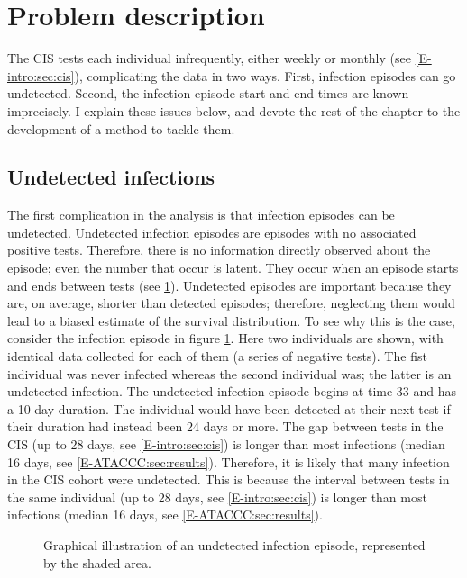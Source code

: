 \documentclass[thesis.tex]{subfiles}
\begin{document}
\section{Problem description} \label{perf-test:sec:problem}

The CIS tests each individual infrequently, either weekly or monthly (see \cref{E-intro:sec:cis}), complicating the data in two ways.
First, infection episodes can go undetected.
Second, the infection episode start and end times are known imprecisely.
I explain these issues below, and devote the rest of the chapter to the development of a method to tackle  them.

\subsection{Undetected infections} \label{perf-test:sec:undetected}

The first complication in the analysis is that infection episodes can be undetected.
Undetected infection episodes are episodes with no associated positive tests.
Therefore, there is no information directly observed about the episode; even the number that occur is latent.
They occur when an episode starts and ends between tests (see \cref{perf-test:fig:truncation}).
Undetected episodes are important because they are, on average, shorter than detected episodes; therefore, neglecting them would lead to a biased estimate of the survival distribution.
To see why this is the case, consider the infection episode in figure \cref{perf-test:fig:truncation}.
Here two individuals are shown, with identical data collected for each of them (a series of negative
tests).
The fist individual was never infected whereas the second individual was; the latter is an undetected infection. 
The undetected infection episode begins at time 33 and has a 10-day duration.
The individual would have been detected at their next test if their duration had instead been 24 days or more.
The gap between tests in the CIS (up to 28 days, see \cref{E-intro:sec:cis}) is longer than most infections (median 16 days, see \cref{E-ATACCC:sec:results}).
Therefore, it is likely that many infection in the CIS cohort were undetected.
This is because the interval between tests in the same individual (up to 28 days, see \cref{E-intro:sec:cis}) is longer than most infections (median 16 days, see \cref{E-ATACCC:sec:results}).
\begin{figure}
  \caption[Undetected episodes in CIS data]{Graphical illustration of an undetected infection episode, represented by the shaded area. \label{perf-test:fig:truncation}}
\end{figure}
\end{document}
